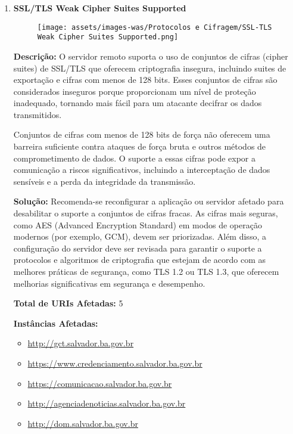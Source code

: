 \documentclass[a4paper,12pt]{article}
\begin{document}
\begin{enumerate}
\item \textbf{SSL/TLS Weak Cipher Suites Supported}

                        \begin{figure}[h!]
                        \centering
                        \texttt{[image: assets/images-was/Protocolos e Cifragem/SSL-TLS Weak Cipher Suites Supported.png]}
                        \end{figure}
                        \FloatBarrier
                        \textbf{Descrição:} O servidor remoto suporta o uso de conjuntos de cifras (cipher suites) de SSL/TLS que oferecem criptografia insegura, incluindo suites de exportação e cifras com menos de 128 bits. Esses conjuntos de cifras são considerados inseguros porque proporcionam um nível de proteção inadequado, tornando mais fácil para um atacante decifrar os dados transmitidos.

    Conjuntos de cifras com menos de 128 bits de força não oferecem uma barreira suficiente contra ataques de força bruta e outros métodos de comprometimento de dados. O suporte a essas cifras pode expor a comunicação a riscos significativos, incluindo a interceptação de dados sensíveis e a perda da integridade da transmissão.

\textbf{Solução:} Recomenda-se reconfigurar a aplicação ou servidor afetado para desabilitar o suporte a conjuntos de cifras fracas. As cifras mais seguras, como AES (Advanced Encryption Standard) em modos de operação modernos (por exemplo, GCM), devem ser priorizadas. Além disso, a configuração do servidor deve ser revisada para garantir o suporte a protocolos e algoritmos de criptografia que estejam de acordo com as melhores práticas de segurança, como TLS 1.2 ou TLS 1.3, que oferecem melhorias significativas em segurança e desempenho.

\textbf{Total de URIs Afetadas:} 5

\textbf{Instâncias Afetadas:}
\begin{itemize}
    \item \url{http://gct.salvador.ba.gov.br}
    \item \url{https://www.credenciamento.salvador.ba.gov.br}
    \item \url{https://comunicacao.salvador.ba.gov.br}
    \item \url{http://agenciadenoticias.salvador.ba.gov.br}
    \item \url{http://dom.salvador.ba.gov.br}
\end{itemize}


\end{enumerate}
\end{document}
